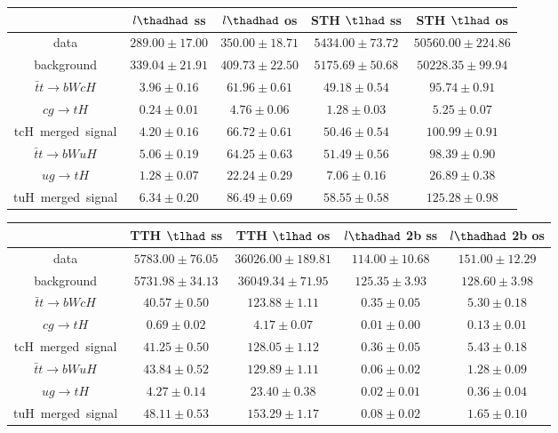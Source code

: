 \centering
\begin{tabular}{|c|c|c|c|c|} \hline
 & $l\thadhad$ ss & $l\thadhad$ os & STH $\tlhad$ ss & STH $\tlhad$ os\\\hline
data & $289.00\pm17.00$ & $350.00\pm18.71$ & $5434.00\pm73.72$ & $50560.00\pm224.86$\\\hline
background & $339.04\pm21.91$ & $409.73\pm22.50$ & $5175.69\pm50.68$ & $50228.35\pm99.94$\\\hline
$\bar{t}t\to bWcH$ & $3.96\pm0.16$ & $61.96\pm0.61$ & $49.18\pm0.54$ & $95.74\pm0.91$\\\hline
$cg\to tH$ & $0.24\pm0.01$ & $4.76\pm0.06$ & $1.28\pm0.03$ & $5.25\pm0.07$\\\hline
tcH~merged~signal & $4.20\pm0.16$ & $66.72\pm0.61$ & $50.46\pm0.54$ & $100.99\pm0.91$\\\hline
$\bar{t}t\to bWuH$ & $5.06\pm0.19$ & $64.25\pm0.63$ & $51.49\pm0.56$ & $98.39\pm0.90$\\\hline
$ug\to tH$ & $1.28\pm0.07$ & $22.24\pm0.29$ & $7.06\pm0.16$ & $26.89\pm0.38$\\\hline
tuH~merged~signal & $6.34\pm0.20$ & $86.49\pm0.69$ & $58.55\pm0.58$ & $125.28\pm0.98$\\\hline
\end{tabular}
\begin{tabular}{|c|c|c|c|c|} \hline
 & TTH $\tlhad$ ss & TTH $\tlhad$ os & $l\thadhad$ 2b ss & $l\thadhad$ 2b os\\\hline
data & $5783.00\pm76.05$ & $36026.00\pm189.81$ & $114.00\pm10.68$ & $151.00\pm12.29$\\\hline
background & $5731.98\pm34.13$ & $36049.34\pm71.95$ & $125.35\pm3.93$ & $128.60\pm3.98$\\\hline
$\bar{t}t\to bWcH$ & $40.57\pm0.50$ & $123.88\pm1.11$ & $0.35\pm0.05$ & $5.30\pm0.18$\\\hline
$cg\to tH$ & $0.69\pm0.02$ & $4.17\pm0.07$ & $0.01\pm0.00$ & $0.13\pm0.01$\\\hline
tcH~merged~signal & $41.25\pm0.50$ & $128.05\pm1.12$ & $0.36\pm0.05$ & $5.43\pm0.18$\\\hline
$\bar{t}t\to bWuH$ & $43.84\pm0.52$ & $129.89\pm1.11$ & $0.06\pm0.02$ & $1.28\pm0.09$\\\hline
$ug\to tH$ & $4.27\pm0.14$ & $23.40\pm0.38$ & $0.02\pm0.01$ & $0.36\pm0.04$\\\hline
tuH~merged~signal & $48.11\pm0.53$ & $153.29\pm1.17$ & $0.08\pm0.02$ & $1.65\pm0.10$\\\hline
\end{tabular}
